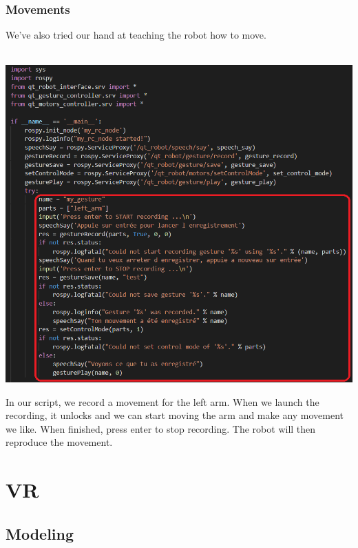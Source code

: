 \subsubsection{Movements}
We've also tried our hand at teaching the robot how to move.\\
\\
\begin{minipage}{.6\textwidth}%
\includegraphics[width=\textwidth]{Figures/qtrobotscript4mouvement.png}
\end{minipage}%
\hfill
\begin{minipage}{.33\textwidth}%
In our script, we record a movement for the left arm. When we launch the recording, it unlocks and we can start moving the arm and make any movement we like. When finished, press enter to stop recording. The robot will then reproduce the movement.\\
\end{minipage}%

\section{VR}
\subsection{Modeling}

